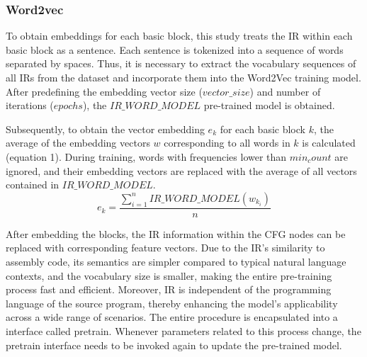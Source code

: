 \documentclass[lineno,sn-mathphys]{sn-jnl}%
\theoremstyle{thmstyleone}%
\theoremstyle{thmstyletwo}%
\theoremstyle{thmstylethree}%
\begin{document}
\subsubsection{Word2vec}
To obtain embeddings for each basic block, this study treats the IR within each basic block as a sentence. Each sentence is tokenized into a sequence of words separated by spaces. Thus, it is necessary to extract the vocabulary sequences of all IRs from the dataset and incorporate them into the Word2Vec training model. After predefining the embedding vector size (\(vector\_size\)) and number of iterations (\(epochs\)), the \(IR\_WORD\_MODEL\) pre-trained model is obtained.\par
Subsequently, to obtain the vector embedding \(e_k\) for each basic block \(k\), the average of the embedding vectors \(w\) corresponding to all words in \(k\) is calculated (equation 1). During training, words with frequencies lower than \(min_count\) are ignored, and their embedding vectors are replaced with the average of all vectors contained in \(IR\_WORD\_MODEL\).
\begin{equation}
  {e_k} = \frac{{\sum\limits_{i = 1}^n {IR\_WORD\_MODEL({w_{{k_i}}})} }}{n}\label{eq1}
\end{equation}\par
After embedding the blocks, the IR information within the CFG nodes can be replaced with corresponding feature vectors. Due to the IR's similarity to assembly code, its semantics are simpler compared to typical natural language contexts, and the vocabulary size is smaller, making the entire pre-training process fast and efficient. Moreover, IR is independent of the programming language of the source program, thereby enhancing the model's applicability across a wide range of scenarios. The entire procedure is encapsulated into a interface called pretrain. Whenever parameters related to this process change, the pretrain interface needs to be invoked again to update the pre-trained model.
\end{document}
